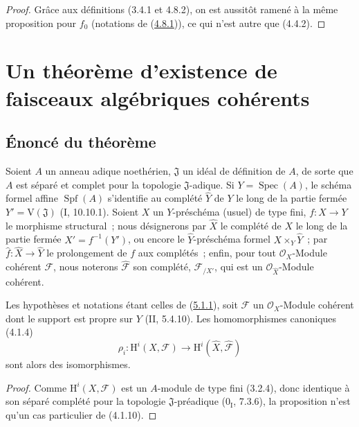\begin{proof}
Grâce aux définitions (3.4.1 et 4.8.2), on est aussitôt ramené à la même proposition
pour $f_0$ (notations de (\hyperref[III.4.8.1-fr]{4.8.1})), ce qui n'est autre que
(4.4.2).
\end{proof}

\section{Un théorème d'existence de faisceaux algébriques cohérents}
\label{section:III.5-fr}

\subsection{Énoncé du théorème}
\label{subsection:III.5.1-fr}

\begin{env}[5.1.1]
\label{III.5.1.1-fr}
Soient $A$ un anneau adique noethérien, $\mathfrak J$ un idéal de définition de
$A$, de sorte que $A$ est séparé et complet pour la topologie $\mathfrak J$-adique.
Si $Y=\operatorname{Spec}(A)$, le schéma formel affine $\operatorname{Spf}(A)$
s'identifie au complété $\widehat Y$ de $Y$ le long de la partie fermée
$Y'=\mathrm V(\mathfrak J)$ (I, 10.10.1). Soient $X$ un $Y$-préschéma (usuel) de
type fini, $f:X\to Y$ le morphisme structural~; nous désignerons par $\widehat X$
le complété de $X$ le long de la partie fermée $X'=f^{-1}(Y')$, ou encore le
$\widehat Y$-préschéma formel $X\times_Y\widehat Y$~; par
$\widehat f:\widehat X\to\widehat Y$ le prolongement de $f$ aux complétés~; enfin,
pour tout $\mathcal O_X$-Module cohérent $\mathcal F$, nous noterons
$\widehat{\mathcal F}$ son complété, $\mathcal F_{/X'}$, qui est un
$\mathcal O_{\widehat X}$-Module cohérent.
\end{env}

\begin{proposition}[5.1.2]
\label{III.5.1.2-fr}
Les hypothèses et notations étant celles de
(\hyperref[III.5.1.1-fr]{5.1.1}), soit $\mathcal F$ un $\mathcal O_X$-Module
cohérent dont le support est propre sur $Y$ (II, 5.4.10). Les homomorphismes
canoniques (4.1.4)
\[
\rho_i:\mathrm H^i(X,\mathcal F)\longrightarrow
\mathrm H^i(\widehat X,\widehat{\mathcal F})
\]
sont alors des isomorphismes.
\end{proposition}

\begin{proof}
Comme $\mathrm H^i(X,\mathcal F)$ est un $A$-module de type fini (3.2.4), donc
identique à son séparé complété pour la topologie $\mathfrak J$-préadique
($0_{\mathrm I}$, 7.3.6), la proposition n'est qu'un cas particulier de (4.1.10).
\end{proof}

